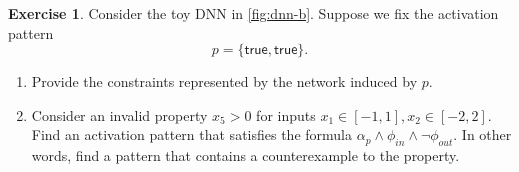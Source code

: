 \documentclass[oneside,11pt,dvipsnames]{book}
\numberwithin{equation}{section}
\theoremstyle{definition}
\newtheorem{exercise}{Exercise}[section]
\theoremstyle{remark}
\begin{document}
\begin{exercise}\label{exercise:nnv-pattern}
Consider the toy DNN in \autoref{fig:dnn-b}. Suppose we fix the activation pattern
\[
p=\{\mathsf{true}, \mathsf{true}\}.
\]
\begin{enumerate}
  \item Provide the constraints represented by the network induced by $p$.
  \item Consider an invalid property $x_5 > 0$ for inputs $x_1 \in [-1,1], x_2 \in [-2,2]$. Find an activation pattern that satisfies the formula $\alpha_p \land \phi_{in} \land \neg \phi_{out}$. In other words, find a pattern that contains a counterexample to the property.
\end{enumerate}

\end{exercise}




\end{document}
